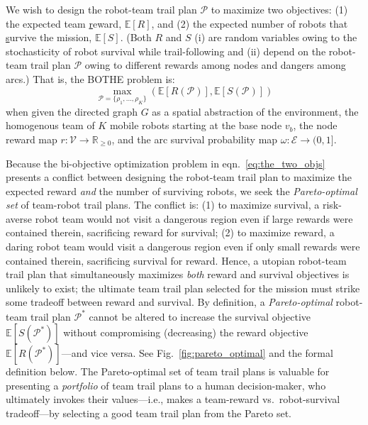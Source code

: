 \documentclass[11pt, oneside]{article}
\begin{document}
We wish to design the robot-team trail plan $\mathcal{P}$ to maximize two objectives: 
(1) the expected team \underline{r}eward, $\mathbb{E}[R]$, and (2) the expected number of robots that \underline{s}urvive the mission, $\mathbb{E}[S]$. (Both $R$ and $S$ (i) are random variables owing to the stochasticity of robot survival while trail-following and (ii) depend on the robot-team trail plan $\mathcal{P}$ owing to different rewards among nodes and dangers among arcs.) 
That is, the BOTHE problem is:
\begin{equation}
	\max_{\mathcal{P}=\{\rho_1, ..., \rho_K\}} \left( \mathbb{E}[R(\mathcal{P})], \mathbb{E}[S(\mathcal{P})] \right)
	\label{eq:the_two_objs}
\end{equation}
when given the directed graph $G$ as a spatial abstraction of the environment, 
the homogenous team of $K$ mobile robots starting at the base node $v_b$,
the node reward map $r: \mathcal{V} \rightarrow \mathbb{R}_{\geq 0}$, and the arc survival probability map $\omega : \mathcal{E} \rightarrow (0, 1]$.

Because the bi-objective optimization problem in eqn.~\ref{eq:the_two_objs} presents a conflict between designing the robot-team trail plan to maximize the expected reward \emph{and} the number of surviving robots, we seek the \emph{Pareto-optimal set} \cite{pardalos2017non,branke2008multiobjective} of team-robot trail plans. 
The conflict is: 
(1) to maximize survival, a risk-averse robot team would not visit a dangerous region even if large rewards were contained therein, sacrificing reward for survival; 
(2) to maximize reward, a daring robot team would visit a dangerous region even if only small rewards were contained therein, sacrificing survival for reward. 
Hence, a utopian robot-team trail plan that simultaneously maximizes \emph{both} reward and survival objectives is unlikely to exist; the ultimate team trail plan selected for the mission must strike some tradeoff between reward and survival.
By definition, a \emph{Pareto-optimal} \cite{pardalos2017non,branke2008multiobjective} robot-team trail plan $\mathcal{P}^*$ cannot be altered to increase the survival objective $\mathbb{E}[S(\mathcal{P}^*)]$ without compromising (decreasing) the reward objective $\mathbb{E}[R(\mathcal{P}^*)]$---and vice versa. See Fig.~\ref{fig:pareto_optimal} and the formal definition below.
The Pareto-optimal set of team trail plans is valuable for presenting a \emph{portfolio} of team trail plans to a human decision-maker, who ultimately invokes their values---i.e., makes a team-reward vs.\  robot-survival tradeoff---by selecting a good team trail plan from the Pareto set.
\end{document}
